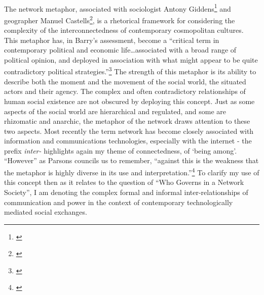 \paragraph{}The network metaphor, associated with sociologist Antony Giddens\footnote{\cite{Giddens:1990cm}} and geographer Manuel Castells\footnote{\cite{Castells:1996ns}}, is a rhetorical framework for considering the complexity of the interconnectedness of contemporary cosmopolitan cultures. This metaphor has, in Barry's assessment, become a ``critical term in contemporary political and economic life\ldots associated with a broad range of political opinion, and deployed in association with what might appear to be quite contradictory political strategies.''\footnote{\cite[p.85]{Barry:2001ff}} The strength of this metaphor is its ability to describe both the moment and the movement of the social world, the situated actors and their agency. The complex and often contradictory relationships of human social existence are not obscured by deploying this concept. Just as some aspects of the social world are hierarchical and regulated, and some are rhizomatic and anarchic, the metaphor of the network draws attention to these two aspects. Most recently the term network has become closely associated with information and communications technologies, especially with the internet - the prefix \textit{inter-} highlights again my theme of connectedness, of `being among'.  ``However'' as Parsons councils us to remember, ``against this is the weakness that the metaphor is highly diverse in its use and interpretation.''\footnote{\cite[p.185]{parsons:1995}} To clarify my use of this concept then as it relates to the question of ``Who Governs in a Network Society'', I am denoting the complex formal and informal inter-relationships of communication and power in the context of contemporary technologically mediated social exchanges.

